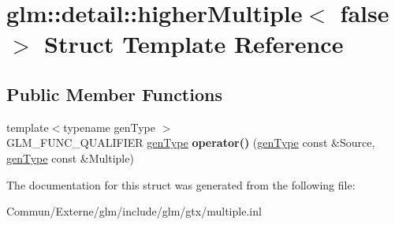\hypertarget{structglm_1_1detail_1_1higher_multiple_3_01false_01_4}{}\section{glm\+:\+:detail\+:\+:higher\+Multiple$<$ false $>$ Struct Template Reference}
\label{structglm_1_1detail_1_1higher_multiple_3_01false_01_4}
\subsection*{Public Member Functions}
\begin{DoxyCompactItemize}
\item 
{\footnotesize template$<$typename gen\+Type $>$ }\\G\+L\+M\+\_\+\+F\+U\+N\+C\+\_\+\+Q\+U\+A\+L\+I\+F\+I\+ER \hyperlink{structglm_1_1detail_1_1gen_type}{gen\+Type} {\bfseries operator()} (\hyperlink{structglm_1_1detail_1_1gen_type}{gen\+Type} const \&Source, \hyperlink{structglm_1_1detail_1_1gen_type}{gen\+Type} const \&Multiple)\hypertarget{structglm_1_1detail_1_1higher_multiple_3_01false_01_4_ae121db4aac2a541989b912b3966bffdb}{}\label{structglm_1_1detail_1_1higher_multiple_3_01false_01_4_ae121db4aac2a541989b912b3966bffdb}

\end{DoxyCompactItemize}


The documentation for this struct was generated from the following file\+:\begin{DoxyCompactItemize}
\item 
Commun/\+Externe/glm/include/glm/gtx/multiple.\+inl\end{DoxyCompactItemize}
